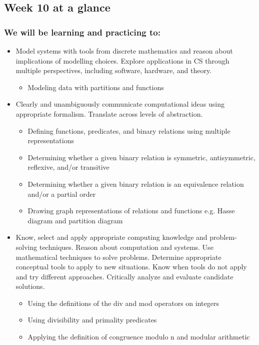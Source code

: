 

\subsection*{Week 10 at a glance}

\subsubsection*{We will be learning and practicing to:}
\begin{itemize}
\item Model systems with tools from discrete mathematics and reason about implications of modelling choices. Explore applications in CS through multiple perspectives, including software, hardware, and theory.
\begin{itemize}
    \item Modeling data with partitions and functions
\end{itemize}

\item Clearly and unambiguously communicate computational ideas using appropriate formalism. Translate across levels of abstraction.
\begin{itemize}
    \item Defining functions, predicates, and binary relations using multiple representations
    \item Determining whether a given binary relation is symmetric, antisymmetric, reflexive, and/or transitive
    \item Determining whether a given binary relation is an equivalence relation and/or a partial order
    \item Drawing graph representations of relations and functions e.g. Hasse diagram and partition diagram
\end{itemize}

\item Know, select and apply appropriate computing knowledge and problem-solving techniques. Reason about computation and systems. Use mathematical techniques to solve problems. Determine appropriate conceptual tools to apply to new situations. Know when tools do not apply and try different approaches. Critically analyze and evaluate candidate solutions.
\begin{itemize}
    \item Using the definitions of the div and mod operators on integers
    \item Using divisibility and primality predicates
    \item Applying the definition of congruence modulo n and modular arithmetic
\end{itemize}


\end{itemize}
